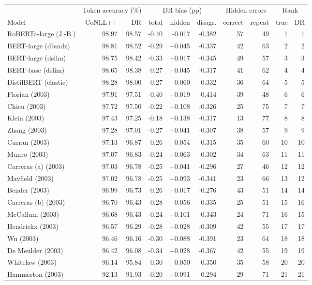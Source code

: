 \begin{tabular}{lrrrrrrrrr}
\toprule
 & \multicolumn{2}{c}{Token accuracy (\%)} & \multicolumn{3}{c}{DR bias (pp)} & \multicolumn{2}{c}{Hidden errors} & \multicolumn{2}{c}{Rank} \\
\cmidrule(lr){2-3}\cmidrule(lr){4-6}\cmidrule(lr){7-8}\cmidrule(lr){9-10}
Model & CoNLL++ & DR & total & hidden & disagr. & correct & repeat & true & DR \\
\midrule
RoBERTa-large (J.-B.) & 98.97 & 98.57 & -0.40 & -0.017 & -0.382 & 57 & 49 & 1 & 1 \\
BERT-large (dbmdz) & 98.81 & 98.52 & -0.29 & +0.045 & -0.337 & 42 & 63 & 2 & 2 \\
BERT-large (dslim) & 98.75 & 98.42 & -0.33 & +0.017 & -0.345 & 49 & 57 & 3 & 3 \\
BERT-base (dslim) & 98.65 & 98.38 & -0.27 & +0.045 & -0.317 & 41 & 62 & 4 & 4 \\
DistilBERT (elastic) & 98.28 & 98.00 & -0.27 & +0.060 & -0.332 & 36 & 64 & 5 & 5 \\
Florian (2003) & 97.91 & 97.51 & -0.40 & +0.019 & -0.414 & 39 & 48 & 6 & 6 \\
Chieu (2003) & 97.72 & 97.50 & -0.22 & +0.108 & -0.326 & 25 & 75 & 7 & 7 \\
Klein (2003) & 97.43 & 97.25 & -0.18 & +0.138 & -0.317 & 13 & 77 & 8 & 8 \\
Zhang (2003) & 97.28 & 97.01 & -0.27 & +0.041 & -0.307 & 38 & 57 & 9 & 9 \\
Curran (2003) & 97.13 & 96.87 & -0.26 & +0.054 & -0.315 & 35 & 60 & 10 & 10 \\
Munro (2003) & 97.07 & 96.83 & -0.24 & +0.063 & -0.302 & 34 & 63 & 11 & 11 \\
Carreras (a) (2003) & 97.03 & 96.78 & -0.25 & +0.041 & -0.296 & 27 & 46 & 12 & 12 \\
Mayfield (2003) & 97.02 & 96.78 & -0.25 & +0.093 & -0.341 & 23 & 66 & 13 & 12 \\
Bender (2003) & 96.99 & 96.73 & -0.26 & +0.017 & -0.276 & 43 & 51 & 14 & 14 \\
Carreras (b) (2003) & 96.70 & 96.43 & -0.28 & +0.056 & -0.335 & 25 & 51 & 15 & 16 \\
McCallum (2003) & 96.68 & 96.43 & -0.24 & +0.101 & -0.343 & 24 & 71 & 16 & 15 \\
Hendrickx (2003) & 96.57 & 96.29 & -0.28 & +0.028 & -0.309 & 42 & 55 & 17 & 17 \\
Wu (2003) & 96.46 & 96.16 & -0.30 & +0.088 & -0.391 & 23 & 64 & 18 & 18 \\
De Meulder (2003) & 96.42 & 96.08 & -0.34 & +0.028 & -0.367 & 42 & 55 & 19 & 19 \\
Whitelaw (2003) & 96.14 & 95.84 & -0.30 & +0.050 & -0.350 & 35 & 58 & 20 & 20 \\
Hammerton (2003) & 92.13 & 91.93 & -0.20 & +0.091 & -0.294 & 29 & 71 & 21 & 21 \\
\bottomrule
\end{tabular}
